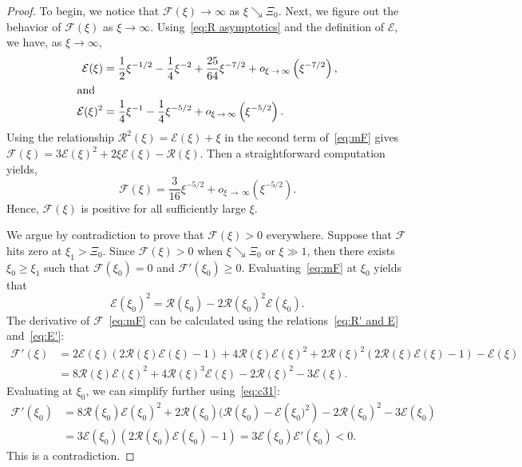 \documentclass[10pt]{amsart}
\theoremstyle{definition}\newtheorem{defi}[theo]{Definition}\newtheorem{rema}[theo]{Remark}\newtheorem{exam}[theo]{Example}\newtheorem{exem}[theo]{Example}\newtheorem{nota}[theo]{Notation}
\newcommand{\mE}{\mathcal{E}}
\newcommand{\mF}{\mathcal{F}}
\newcommand{\mR}{\mathcal{R}}
\newcommand{\1}{\mathds{1}}
\begin{document}
\begin{proof}
To begin, we notice that $\mF(\xi) \to \infty$ as $\xi \searrow \Xi_0$. Next, we figure out the behavior of $\mF(\xi)$ as $\xi\to\infty$. Using~\eqref{eq:R asymptotics} and the definition of $\mE$, we have, as $\xi\to \infty$,
\begin{align*}
\mE(\xi) &= \frac{1}{2}\xi^{-1/2} - \frac{1}{4}\xi^{-2}+\frac{25}{64} \xi^{-7/2} + o_{\xi\,\rightarrow\,\infty}\left(\xi^{-7/2}\right), \\
\intertext{and}
\mE(\xi)^2 &= \frac{1}{4}\xi^{-1} - \frac{1}{4}\xi^{-5/2} + o_{\xi\,\rightarrow\,\infty}\left(\xi^{-5/2}\right).
\end{align*}
Using the relationship $\mR^2(\xi)=\mE(\xi)+\xi$ in the second term of~\eqref{eq:mF} gives $\mF(\xi) = 3\mE(\xi)^2 + 2 \xi \mE(\xi) - \mR(\xi)$. Then a straightforward computation yields,
\[
\mF(\xi) = \frac{3}{16}\xi^{-5/2}+o_{\xi\,\rightarrow\,\infty}\left(\xi^{-5/2}\right).
\]
Hence, $\mF(\xi)$ is positive for all sufficiently large $\xi$.



We argue by contradiction to prove that $\mF(\xi)>0$ everywhere. Suppose that $\mF$ hits zero at $\xi_1>\Xi_0$. Since $\mF(\xi) >0$ when $\xi \searrow \Xi_0$ or $\xi \gg 1$, then there exists $\xi_0 \geq \xi_1$ such that $\mF(\xi_0) = 0$ and $\mF'(\xi_0) \geq 0$. Evaluating~\eqref{eq:mF} at $\xi_0$ yields that
\begin{equation}\label{eq:c31}
\mE(\xi_0)^2 = \mR(\xi_0) - 2\mR(\xi_0)^2\mE(\xi_0).
\end{equation}
The derivative of $\mF$~\eqref{eq:mF} can be calculated using the relations~\eqref{eq:R' and E} and~\eqref{eq:E'}:
\begin{align*}
\mF'(\xi) & = 2 \mE(\xi)\left(2 \mR(\xi) \mE(\xi) - 1 \right) + 4\mR(\xi) \mE(\xi)^2 + 2\mR(\xi)^2 \left (2 \mR(\xi) \mE(\xi) - 1 \right) - \mE(\xi) \\
& = 8\mR(\xi) \mE(\xi)^2 + 4 \mR(\xi)^3\mE(\xi) - 2\mR(\xi)^2 - 3\mE(\xi).
\end{align*}
Evaluating at $\xi_0$, we can simplify further using~\eqref{eq:c31}:
\begin{align*}
\mF'(\xi_0) & = 8\mR(\xi_0) \mE(\xi_0)^2 + 2 \mR(\xi_0) (\mR(\xi_0) - \mE\left(\xi_0)^2\right) - 2\mR(\xi_0)^2 - 3\mE(\xi_0)\\
& = 3\mE(\xi_0) \left(2 \mR(\xi_0) \mE(\xi_0) - 1\right) = 3\mE(\xi_0)\mE'(\xi_0) < 0.
\end{align*}
This is a contradiction.
\end{proof}
\end{document}
